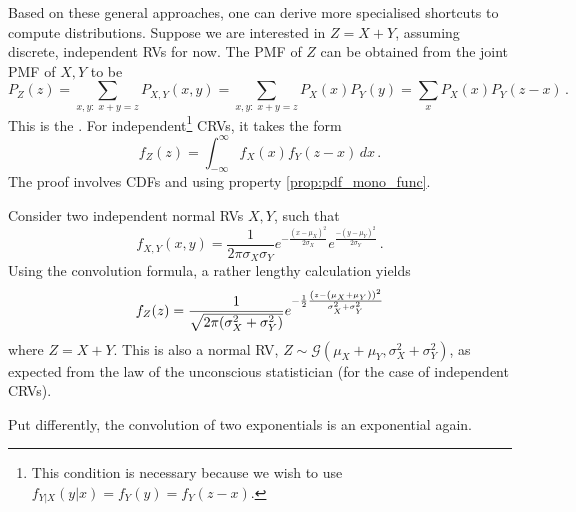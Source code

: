 Based on these general approaches, one can derive more specialised shortcuts to compute distributions. Suppose we are interested in $Z = X + Y$, assuming discrete, independent RVs for now. The PMF of $Z$ can be obtained from the joint PMF of $X, Y$ to be
\begin{equation}
P_Z(z) = \sum_{x, y: \; x + y = z} P_{X, Y}(x, y) = \sum_{x, y: \; x + y = z} P_X(x) P_Y(y) = \sum_x P_X(x) P_Y(z - x) \, .%
\end{equation}
This is the . For independent\footnote{This condition is necessary because we wish to use $f_{Y | X}(y | x) = f_Y(y) = f_Y(z - x)$.} CRVs, it takes the form
\begin{equation}
f_Z(z) = \int_{- \infty}^\infty f_X(x) f_Y(z - x) \, dx \, .
\end{equation}
The proof involves CDFs and using property \ref{prop:pdf_mono_func}.










\begin{ex}
Consider two independent normal RVs $X, Y$, such that
\begin{equation*}
f_{X, Y}(x, y) = \frac{1}{2\pi \sigma_X \sigma_Y} e^{- \frac{(x - \mu_X)^2}{2 \sigma_X}} e^{\frac{- (y - \mu_Y)^2}{2 \sigma_Y}} \, .
\end{equation*}
Using the convolution formula, a rather lengthy calculation yields
\begin{equation}
f_Z(z) = \frac{1}{\sqrt{2 \pi \qty(\sigma_X^2 + \sigma_Y^2)}} e^{- \frac{1}{2} \frac{\qty(z - \qty(\mu_X + \mu_Y))^2}{\sigma_X^2 + \sigma_Y^2}}
\end{equation}
where $Z = X + Y$. This is also a normal RV, $Z \sim \mathcal{G}(\mu_X + \mu_Y, \sigma_X^2 + \sigma_Y^2)$, as expected from the law of the unconscious statistician (for the case of independent CRVs).

Put differently, the convolution of two exponentials is an exponential again.
\end{ex}


